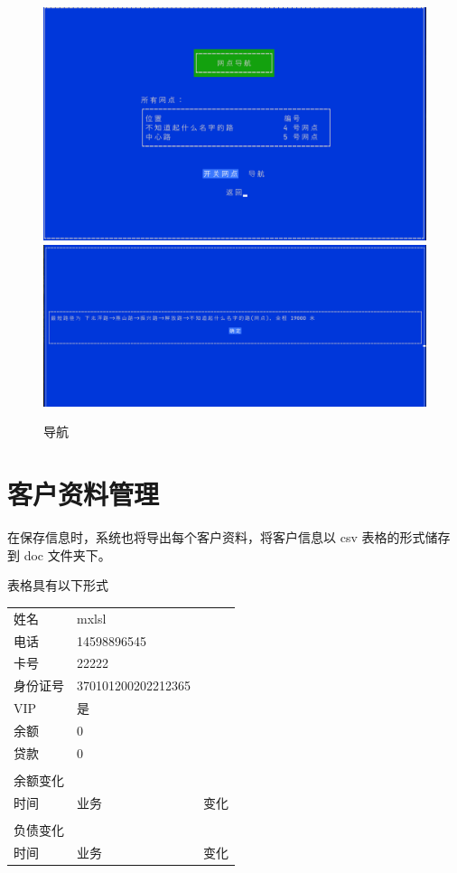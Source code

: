 \documentclass{ctexrep}
\begin{document}
\begin{figure}[H]
  \centering
  \includegraphics[scale=0.58]{preview_map.png}
  \includegraphics[scale=0.48]{preview_map1.png}
  \caption{导航}
\end{figure}

\section{客户资料管理}
在保存信息时，系统也将导出每个客户资料，将客户信息以 csv 表格的形式储存到 doc 文件夹下。

表格具有以下形式
\begin{center}
  \begin{tabular}{|p{3.3cm} p{3.3cm} p{3.3cm}| }
    \hline 姓名 & mxlsl              &      \\
    电话        & 14598896545        &      \\
    卡号        & 22222              &      \\
    身份证号    & 370101200202212365 &      \\
    VIP         & 是                 &      \\
    余额        & 0                  &      \\
    贷款        & 0                  &      \\
                &                    &      \\
    余额变化    &                    &      \\
    时间        & 业务               & 变化 \\
                &                    &      \\
    负债变化    &                    &      \\
    时间        & 业务               & 变化 \\
    \hline
  \end{tabular}
\end{center}
\end{document}
